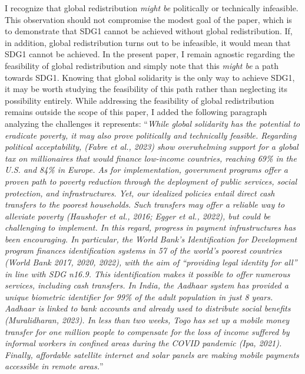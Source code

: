 \documentclass[12pt,english]{article}
\begin{document}
I recognize that global redistribution \textit{might be} politically or technically infeasible. This observation should not compromise the modest goal of the paper, which is to demonstrate that SDG1 cannot be achieved without global redistribution. If, in addition, global redistribution turns out to be infeasible, it would mean that SDG1 cannot be achieved. In the present paper, I remain agnostic regarding the feasibility of global redistribution and simply note that this \textit{might be} a path towards SDG1. Knowing that global solidarity is the only way to achieve SDG1, it may be worth studying the feasibility of this path rather than neglecting its possibility entirely. 
While addressing the feasibility of global redistribution remains outside the scope of this paper, I added the following paragraph analyzing the challenges it represents: 
``\textit{While global solidarity has the potential to eradicate poverty, it may also prove politically and technically feasible. 
Regarding political acceptability, (Fabre et al., 2023) show overwhelming support for a global tax on millionaires that would finance low-income countries, reaching 69\% in the U.S. and 84\% in Europe. %
As for implementation, government programs offer a proven path to poverty reduction through the deployment of public services, social protection, and infrastructures. 
Yet, our idealized policies entail direct cash transfers to the poorest households. Such transfers may offer a reliable way to alleviate poverty (Haushofer et al., 2016; Egger et al., 2022), but could be challenging to implement. In this regard, progress in payment infrastructures has been encouraging. In particular, the World Bank's \textit{Identification for Development} program finances identification systems in 57 of the world's poorest countries (World Bank 2017, 2020, 2022), with the aim of ``providing legal identity for all'' in line with SDG n\textdegree{}16.9. This identification makes it possible to offer numerous services, including cash transfers. In India, the Aadhaar system has provided a unique biometric identifier for 99\% of the adult population in just 8 years. Aadhaar is linked to bank accounts and already used to distribute social benefits (Muralidharan, 2023). In less than two weeks, Togo has set up a mobile money transfer for one million people to compensate for the loss of income suffered by informal workers in confined areas during the COVID pandemic (Ipa, 2021). Finally, affordable satellite internet and solar panels are making mobile payments accessible in remote areas.}''
~\\ ~\\
\end{document}
